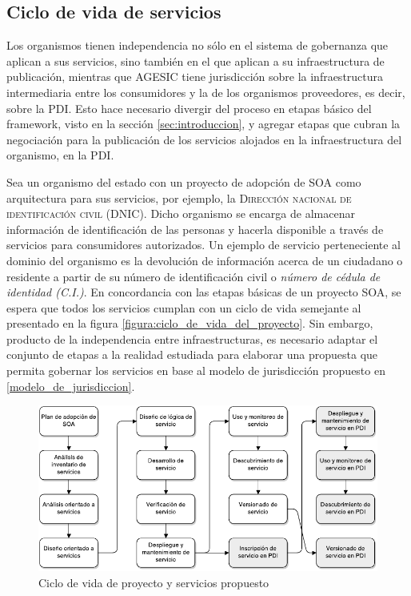 \documentclass[11pt]{article}
\begin{document}
		\subsection{Ciclo de vida de servicios}
			\label{subsec:ciclo_de_vida}
			Los organismos tienen independencia no sólo en el sistema de gobernanza que aplican a sus servicios, sino también en el que aplican a su infraestructura de publicación, mientras que AGESIC tiene jurisdicción sobre la infraestructura intermediaria entre los consumidores y la de los organismos proveedores, es decir, sobre la PDI. Esto hace necesario divergir del proceso en etapas básico del framework, visto en la sección \ref{sec:introduccion}, y agregar etapas que cubran la negociación para la publicación de los servicios alojados en la infraestructura del organismo, en la PDI.

			Sea un organismo del estado con un proyecto de adopción de SOA como arquitectura para sus servicios, por ejemplo, la \textsc{Dirección nacional de identificación civil (DNIC)}. Dicho organismo se encarga de almacenar información de identificación de las personas y hacerla disponible a través de servicios para consumidores autorizados. Un ejemplo de servicio perteneciente al dominio del organismo es la devolución de información acerca de un ciudadano o residente a partir de su número de identificación civil o \emph{número de cédula de identidad (C.I.)}. En concordancia con las etapas básicas de un proyecto SOA, se espera que todos los servicios cumplan con un ciclo de vida semejante al presentado en la figura \ref{figura:ciclo_de_vida_del_proyecto}. Sin embargo, producto de la independencia entre infraestructuras, es necesario adaptar el conjunto de etapas a la realidad estudiada para elaborar una propuesta que permita gobernar los servicios en base al modelo de jurisdicción propuesto en \ref{modelo_de_jurisdiccion}.

			\begin{figure}[h]
				\centering
				\includegraphics[width=\linewidth]{ciclo_de_vida_propuesta}
				\caption{Ciclo de vida de proyecto y servicios propuesto}
				\label{imagen:ciclo_de_vida_propuesta}
			\end{figure}
\end{document}
